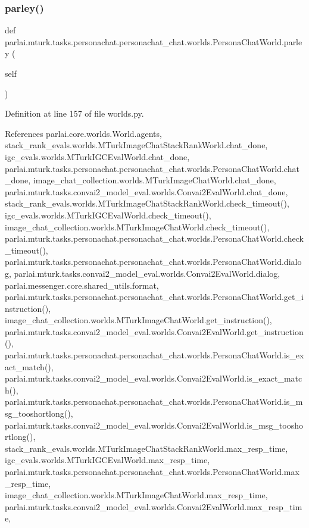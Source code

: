 \subsubsection{\texorpdfstring{parley()}{parley()}}
{\footnotesize\ttfamily def parlai.\+mturk.\+tasks.\+personachat.\+personachat\+\_\+chat.\+worlds.\+Persona\+Chat\+World.\+parley (\begin{DoxyParamCaption}\item[{}]{self }\end{DoxyParamCaption})}



Definition at line 157 of file worlds.\+py.



References parlai.\+core.\+worlds.\+World.\+agents, stack\+\_\+rank\+\_\+evals.\+worlds.\+M\+Turk\+Image\+Chat\+Stack\+Rank\+World.\+chat\+\_\+done, igc\+\_\+evals.\+worlds.\+M\+Turk\+I\+G\+C\+Eval\+World.\+chat\+\_\+done, parlai.\+mturk.\+tasks.\+personachat.\+personachat\+\_\+chat.\+worlds.\+Persona\+Chat\+World.\+chat\+\_\+done, image\+\_\+chat\+\_\+collection.\+worlds.\+M\+Turk\+Image\+Chat\+World.\+chat\+\_\+done, parlai.\+mturk.\+tasks.\+convai2\+\_\+model\+\_\+eval.\+worlds.\+Convai2\+Eval\+World.\+chat\+\_\+done, stack\+\_\+rank\+\_\+evals.\+worlds.\+M\+Turk\+Image\+Chat\+Stack\+Rank\+World.\+check\+\_\+timeout(), igc\+\_\+evals.\+worlds.\+M\+Turk\+I\+G\+C\+Eval\+World.\+check\+\_\+timeout(), image\+\_\+chat\+\_\+collection.\+worlds.\+M\+Turk\+Image\+Chat\+World.\+check\+\_\+timeout(), parlai.\+mturk.\+tasks.\+personachat.\+personachat\+\_\+chat.\+worlds.\+Persona\+Chat\+World.\+check\+\_\+timeout(), parlai.\+mturk.\+tasks.\+personachat.\+personachat\+\_\+chat.\+worlds.\+Persona\+Chat\+World.\+dialog, parlai.\+mturk.\+tasks.\+convai2\+\_\+model\+\_\+eval.\+worlds.\+Convai2\+Eval\+World.\+dialog, parlai.\+messenger.\+core.\+shared\+\_\+utils.\+format, parlai.\+mturk.\+tasks.\+personachat.\+personachat\+\_\+chat.\+worlds.\+Persona\+Chat\+World.\+get\+\_\+instruction(), image\+\_\+chat\+\_\+collection.\+worlds.\+M\+Turk\+Image\+Chat\+World.\+get\+\_\+instruction(), parlai.\+mturk.\+tasks.\+convai2\+\_\+model\+\_\+eval.\+worlds.\+Convai2\+Eval\+World.\+get\+\_\+instruction(), parlai.\+mturk.\+tasks.\+personachat.\+personachat\+\_\+chat.\+worlds.\+Persona\+Chat\+World.\+is\+\_\+exact\+\_\+match(), parlai.\+mturk.\+tasks.\+convai2\+\_\+model\+\_\+eval.\+worlds.\+Convai2\+Eval\+World.\+is\+\_\+exact\+\_\+match(), parlai.\+mturk.\+tasks.\+personachat.\+personachat\+\_\+chat.\+worlds.\+Persona\+Chat\+World.\+is\+\_\+msg\+\_\+tooshortlong(), parlai.\+mturk.\+tasks.\+convai2\+\_\+model\+\_\+eval.\+worlds.\+Convai2\+Eval\+World.\+is\+\_\+msg\+\_\+tooshortlong(), stack\+\_\+rank\+\_\+evals.\+worlds.\+M\+Turk\+Image\+Chat\+Stack\+Rank\+World.\+max\+\_\+resp\+\_\+time, igc\+\_\+evals.\+worlds.\+M\+Turk\+I\+G\+C\+Eval\+World.\+max\+\_\+resp\+\_\+time, parlai.\+mturk.\+tasks.\+personachat.\+personachat\+\_\+chat.\+worlds.\+Persona\+Chat\+World.\+max\+\_\+resp\+\_\+time, image\+\_\+chat\+\_\+collection.\+worlds.\+M\+Turk\+Image\+Chat\+World.\+max\+\_\+resp\+\_\+time, parlai.\+mturk.\+tasks.\+convai2\+\_\+model\+\_\+eval.\+worlds.\+Convai2\+Eval\+World.\+max\+\_\+resp\+\_\+time, 